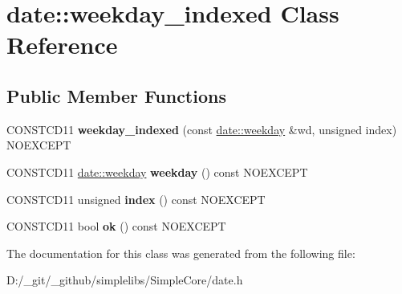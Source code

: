 \hypertarget{classdate_1_1weekday__indexed}{}\section{date\+::weekday\+\_\+indexed Class Reference}
\label{classdate_1_1weekday__indexed}
\subsection*{Public Member Functions}
\begin{DoxyCompactItemize}
\item 
\mbox{\label{classdate_1_1weekday__indexed_a2e7be193a460dc7b96589dbe8ed5aa57}} 
C\+O\+N\+S\+T\+C\+D11 {\bfseries weekday\+\_\+indexed} (const \mbox{\hyperlink{classdate_1_1weekday}{date\+::weekday}} \&wd, unsigned index) N\+O\+E\+X\+C\+E\+PT
\item 
\mbox{\label{classdate_1_1weekday__indexed_ae991a428fa28305cde2a4b0c0b553678}} 
C\+O\+N\+S\+T\+C\+D11 \mbox{\hyperlink{classdate_1_1weekday}{date\+::weekday}} {\bfseries weekday} () const N\+O\+E\+X\+C\+E\+PT
\item 
\mbox{\label{classdate_1_1weekday__indexed_a5328075940e97b5f5ad717892935c15a}} 
C\+O\+N\+S\+T\+C\+D11 unsigned {\bfseries index} () const N\+O\+E\+X\+C\+E\+PT
\item 
\mbox{\label{classdate_1_1weekday__indexed_a9fd7c06cd1190bb5bf32c69316a1100b}} 
C\+O\+N\+S\+T\+C\+D11 bool {\bfseries ok} () const N\+O\+E\+X\+C\+E\+PT
\end{DoxyCompactItemize}


The documentation for this class was generated from the following file\+:\begin{DoxyCompactItemize}
\item 
D\+:/\+\_\+git/\+\_\+github/simplelibs/\+Simple\+Core/date.\+h\end{DoxyCompactItemize}
